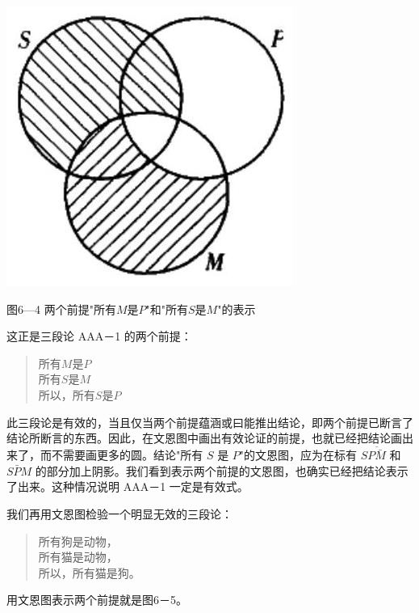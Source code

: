 \begin{center}
\includegraphics[width=\textwidth]{images/2025_05_15_6a28331d5e7c993ad07ag-275.jpg}

图6—4 两个前提"所有$M$是$P$"和"所有$S$是$M$"的表示
\end{center}

这正是三段论 AAA－1 的两个前提：
\begin{quote}
所有$M$是$P$\\
所有$S$是$M$\\
所以，所有$S$是$P$
\end{quote}

此三段论是有效的，当且仅当两个前提蕴涵或曰能推出结论，即两个前提已断言了结论所断言的东西。因此，在文恩图中画出有效论证的前提，也就已经把结论画出来了，而不需要画更多的圆。结论"所有 $S$ 是 $P$"的文恩图，应为在标有 $S\overline{P\bar{M}}$ 和 $S\bar{P}M$ 的部分加上阴影。我们看到表示两个前提的文恩图，也确实已经把结论表示了出来。这种情况说明 AAA－1 一定是有效式。\cite{venn1881}

我们再用文恩图检验一个明显无效的三段论：

\begin{quote}
所有狗是动物，\\
所有猫是动物，\\
所以，所有猫是狗。
\end{quote}

用文恩图表示两个前提就是图6－5。

